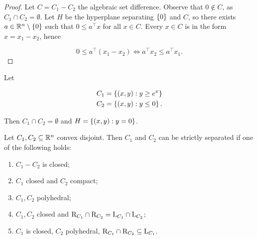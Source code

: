 \begin{proof}
    
    Let $C = C_1 - C_2$ the algebraic set difference. Observe that $0 \notin C$, as $C_1 \cap C_2 = \emptyset$. Let $H$ be the hyperplane separating $\left\{ 0 \right\}$ and $C$, so there exists $a \in {\mathbb{R}^n} \setminus\left\{ 0 \right\}$ such that $0 \le a^\top x$ for all $x \in C$. Every $x \in C$ is in the form $x = x_1 - x_2$, hence 

    \[ 0 \le a^\top (x_1 - x_2) \iff a^\top x_2 \le a^\top x_1. \]

\end{proof}

\begin{example}
    
    Let 

    \begin{align*}
        C_1 &= \left\{ (x,y) : y \ge e^x \right\} \\
        C_2 &= \left\{ (x,y) : y \le 0 \right\}.
    \end{align*}

    Then $C_1 \cap C_2 = \emptyset$ and $H = \left\{ (x,y) : y = 0 \right\}$.

\end{example}

\begin{proposition}
    
    Let $C_1,C_2 \subseteq {\mathbb{R}^n}$ convex disjoint. Then $C_1$ and $C_2$ can be strictly separated if one of the following holds:
    
    \begin{enumerate}
        \item $C_1 - C_2$ is closed;
        \item $C_1$ closed and $C_2$ compact;
        \item $C_1,C_2$ polyhedral;
        \item $C_1,C_2$ closed and $\mathrm{R}_{C_1} \cap \mathrm{R}_{C_2} = \mathrm{L}_{C_1} \cap \mathrm{L}_{C_2}$;
        \item $C_1$ is closed, $C_2$ polyhedral, $\mathrm{R}_{C_1} \cap \mathrm{R}_{C_2} \subseteq \mathrm{L}_{C_1}$.
    \end{enumerate}

\end{proposition}

